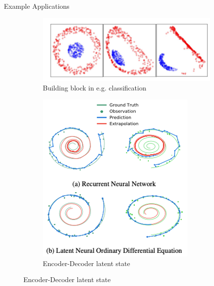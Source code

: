 \documentclass{beamer}
\begin{document}
\begin{frame}{Example Applications}
    \begin{figure}    
    \begin{subfigure}[t]{.45\textwidth}
        \centering
        \includegraphics[width=.85\linewidth]{slides_20231201/figures/2d_class_node.png}
        \caption{Building block in e.g. classification \cite{dupont_augmented_2019}}
      \end{subfigure}
      \qquad
      \begin{subfigure}[t]{.45\textwidth}
        \centering
        \includegraphics[width=.5\linewidth]{slides_20231201/figures/chen_latent_node.png}
        \caption{Encoder-Decoder latent state \cite{chen2019neural}}
      \end{subfigure}
    
      \medskip
    

\end{figure}
\end{frame}
\end{document}
